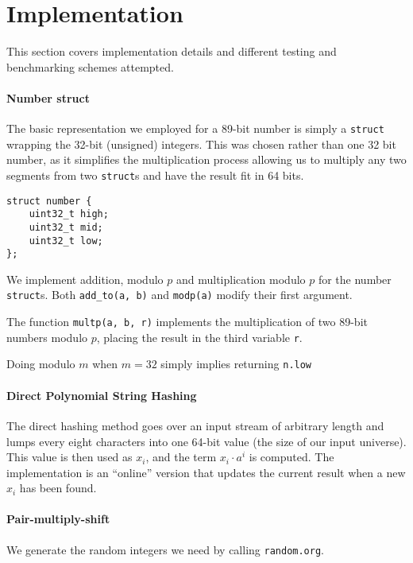 \documentclass[]{article}
\newcommand{\funk}[1]{\texttt{\small #1}}
\begin{document}
\section{Implementation}

This section covers implementation details and different testing and benchmarking schemes attempted.

\paragraph{Number struct}

The basic representation we employed for a 89-bit number is simply a \funk{struct} wrapping the 32-bit (unsigned) integers. This was chosen rather than one 32 bit number, as it simplifies the multiplication process allowing us to multiply any two segments from two \funk{struct}s and have the result fit in 64 bits.

\begin{verbatim}
struct number {
    uint32_t high;
    uint32_t mid;
    uint32_t low;
};
\end{verbatim}

We implement addition, modulo $p$ and multiplication modulo $p$ for the number \funk{struct}s. Both \funk{add\_to(a, b)} and \funk{modp(a)} modify their first argument.

The function \funk{multp(a, b, r)} implements the multiplication of two 89-bit numbers modulo $p$, placing the result in the third variable \funk{r}.

Doing modulo $m$ when $m = 32$ simply implies returning \funk{n.low}

\paragraph{Direct Polynomial String Hashing}

The direct hashing method goes over an input stream of arbitrary length and lumps every eight characters into one 64-bit value (the size of our input universe). This value is then used as $x_i$, and the term $x_i\cdot a^i$ is computed. The implementation is an ``online'' version that updates the current result when a new $x_i$ has been found.

\paragraph{Pair-multiply-shift} 

We generate the random integers we need by calling \texttt{random.org}. 
\end{document}
